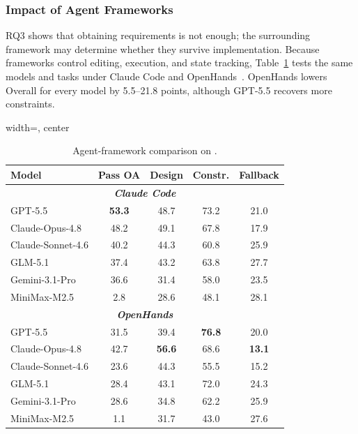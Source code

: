 
\subsubsection{Impact of Agent Frameworks}
\label{sec:framework}

RQ3 shows that obtaining requirements is not enough; the surrounding framework may determine whether they survive implementation. Because frameworks control editing, execution, and state tracking, Table~\ref{tab:framework} tests the same models and tasks under Claude Code and OpenHands~\cite{wang2025openhands}. OpenHands lowers Overall for every model by 5.5--21.8 points, although GPT-5.5 recovers more constraints.

\begin{table}[t]
\centering
\caption{Agent-framework comparison on \rcblite{}.}
\label{tab:framework}
\small
\begin{adjustbox}{width=\linewidth, center}
\begin{tabular}{lcccc}
\toprule
Model & Pass OA & Design & Constr. & Fallback \\
\midrule
\multicolumn{5}{c}{\textbf{\textit{Claude Code}}} \\
\midrule
GPT-5.5 & \textbf{53.3} & 48.7 & 73.2 & 21.0 \\
Claude-Opus-4.8 & 48.2 & 49.1 & 67.8 & 17.9 \\
Claude-Sonnet-4.6 & 40.2 & 44.3 & 60.8 & 25.9 \\
GLM-5.1 & 37.4 & 43.2 & 63.8 & 27.7 \\
Gemini-3.1-Pro & 36.6 & 31.4 & 58.0 & 23.5 \\
MiniMax-M2.5 & 2.8 & 28.6 & 48.1 & 28.1 \\
\midrule
\multicolumn{5}{c}{\textbf{\textit{OpenHands}}} \\
\midrule
GPT-5.5 & 31.5 & 39.4 & \textbf{76.8} & 20.0 \\
Claude-Opus-4.8 & 42.7 & \textbf{56.6} & 68.6 & \textbf{13.1} \\
Claude-Sonnet-4.6 & 23.6 & 44.3 & 55.5 & 15.2 \\
GLM-5.1 & 28.4 & 43.1 & 72.0 & 24.3 \\
Gemini-3.1-Pro & 28.6 & 34.8 & 62.2 & 25.9 \\
MiniMax-M2.5 & 1.1 & 31.7 & 43.0 & 27.6 \\
\bottomrule
\end{tabular}
\end{adjustbox}
\end{table}

